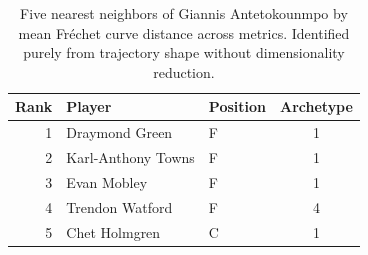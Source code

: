 \begin{table}[htbp]
  \centering\small
  \begin{tabular}{rllc}
    \toprule
    Rank & Player & Position & Archetype \\
    \midrule
    1 & Draymond Green & F & 1 \\
    2 & Karl-Anthony Towns & F & 1 \\
    3 & Evan Mobley & F & 1 \\
    4 & Trendon Watford & F & 4 \\
    5 & Chet Holmgren & C & 1 \\
    \bottomrule
  \end{tabular}
  \caption{Five nearest neighbors of Giannis Antetokounmpo by mean Fr\'{e}chet curve distance across metrics. Identified purely from trajectory shape without dimensionality reduction.}
  \label{tab:Giannis_Antetokounmpo_frechet_curve_neighbors}
\end{table}

